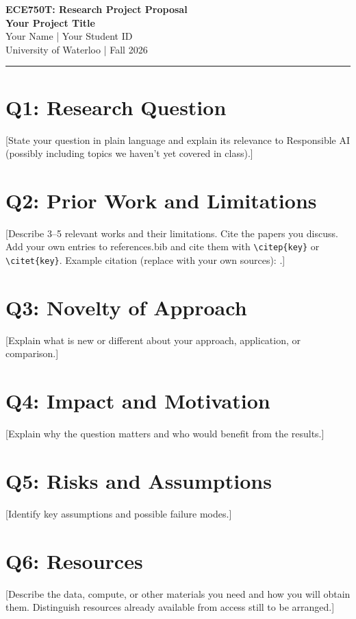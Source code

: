 \documentclass[11pt, letterpaper]{article}
\begin{document}
{\Large\textbf{ECE750T: Research Project Proposal}}\\[5pt]
{\large\textbf{Your Project Title}}\\[4pt]
Your Name \quad | \quad Your Student ID\\
University of Waterloo \quad | \quad Fall 2026
\vspace{0.5em}\hrule\vspace{0.5em}


\section*{Q1: Research Question}
[State your question in plain language and explain its relevance to Responsible AI (possibly including topics we haven't yet covered in class).]

\section*{Q2: Prior Work and Limitations}
[Describe 3--5 relevant works and their limitations. Cite the papers you discuss.
Add your own entries to references.bib and cite them with
\texttt{\textbackslash citep\{key\}} or \texttt{\textbackslash citet\{key\}}.
Example citation (replace with your own sources): \citet{chouldechova2017fair}.]

\section*{Q3: Novelty of Approach}
[Explain what is new or different about your approach, application, or comparison.]

\section*{Q4: Impact and Motivation}
[Explain why the question matters and who would benefit from the results.]

\section*{Q5: Risks and Assumptions}
[Identify key assumptions and possible failure modes.]

\section*{Q6: Resources}
[Describe the data, compute, or other materials you need and how you will obtain
them. Distinguish resources already available from access still to be arranged.]
\end{document}
